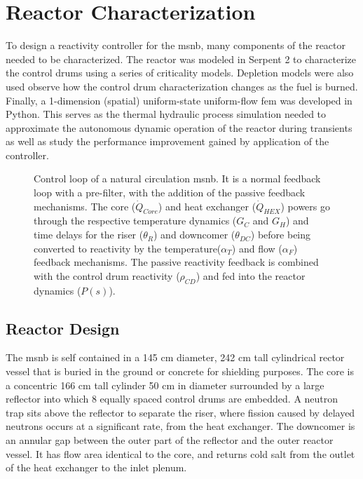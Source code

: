 \chapter{Reactor Characterization}
\label{Chapter:Modeling}
To design a reactivity controller for the \acl{msnb}, many components of the reactor needed to be characterized. The reactor was modeled in Serpent 2 to characterize the control drums using a series of criticality models. Depletion models were also used observe how the control drum characterization changes as the fuel is burned. Finally, a 1-dimension (spatial) uniform-state uniform-flow \acs{fem} was developed in Python. This serves as the thermal hydraulic process simulation needed to approximate the autonomous dynamic operation of the reactor during transients as well as study the performance improvement gained by application of the controller. 

\begin{figure}[!ht]
    \centering
    \resizebox{\textwidth}{!}{}
    \caption[Control loop of a natural circulation \acs{msnb}]{Control loop of a natural circulation \acs{msnb}. It is a normal feedback loop with a pre-filter, with the addition of the passive feedback mechanisms. The core ($\dot{Q}_{Core}$) and heat exchanger ($\dot{Q}_{HEX}$) powers go through the respective temperature dynamics ($G_C$ and $G_H$) and time delays for the riser ($\theta_R$) and downcomer ($\theta_{DC}$) before being converted to reactivity by the temperature($\alpha_T$) and flow ($\alpha_F$) feedback mechanisms. The passive reactivity feedback is combined with the control drum reactivity ($\rho_{CD}$) and fed into the reactor dynamics ($P(s)$).  }
    \label{fig:ReactorControlLoop}
\end{figure}

\section{Reactor Design}\label{Section:RxDesign}
The \acs{msnb} is self contained in a 145 cm diameter, 242 cm tall cylindrical rector vessel that is buried in the ground or concrete for shielding purposes. The core is a concentric 166 cm tall cylinder 50 cm in diameter surrounded by a large reflector into which 8 equally spaced control drums are embedded. A neutron trap sits above the reflector to separate the riser, where fission caused by delayed neutrons occurs at a significant rate, from the heat exchanger. The downcomer is an annular gap between the outer part of the reflector and the outer reactor vessel. It has flow area identical to the core, and returns cold salt from the outlet of the heat exchanger to the inlet plenum.

